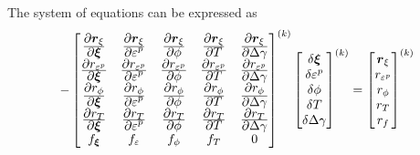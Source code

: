 The system of equations can be expressed as
\[
  -\begin{bmatrix}
    \Partial{\Br_\xi}{\Bxi} & \Partial{\Br_\xi}{\Ve^p} & 
      \Partial{\Br_\xi}{\phi} & \Partial{\Br_\xi}{T} & \Partial{\Br_\xi}{\Delta\gamma} \\
    \Partial{r_{\Ve^p}}{\Bxi} & \Partial{r_{\Ve^p}}{\Ve^p} & 
      \Partial{r_{\Ve^p}}{\phi} & \Partial{r_{\Ve^p}}{T} & \Partial{r_{\Ve^p}}{\Delta\gamma} \\
    \Partial{r_{\phi}}{\Bxi} & \Partial{r_{\phi}}{\Ve^p} & 
      \Partial{r_{\phi}}{\phi} & \Partial{r_{\phi}}{T} & \Partial{r_\phi}{\Delta\gamma} \\
    \Partial{r_{T}}{\Bxi} & \Partial{r_{T}}{\Ve^p} & 
      \Partial{r_{T}}{\phi} & \Partial{r_{T}}{T} & \Partial{r_T}{\Delta\gamma} \\
    f_{\Bxi} & f_{\Ve} & f_\phi & f_T & 0 
  \end{bmatrix}^{(k)}
  \begin{bmatrix}
    \delta\Bxi \\ \delta\Ve^p \\ \delta\phi \\ \delta T \\ \delta\Delta\gamma  
  \end{bmatrix}^{(k)} = 
  \begin{bmatrix}
    \Br_\xi \\ r_{\Ve^p} \\ r_\phi \\ r_T \\ r_f  
  \end{bmatrix}^{(k)}  
\]

